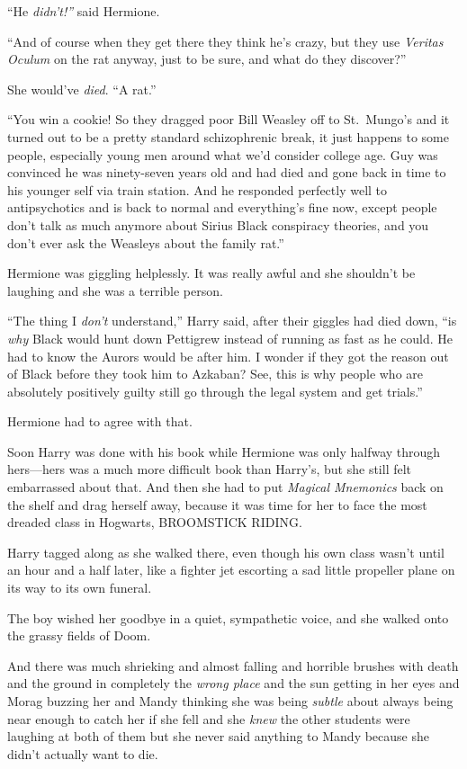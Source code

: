 ``He \emph{didn't!''} said Hermione.

``And of course when they get there they think he's crazy, but they use
\emph{Veritas Oculum} on the rat anyway, just to be sure, and what do
they discover?''

She would've \emph{died}. ``A rat.''

``You win a cookie! So they dragged poor Bill Weasley off to St.~Mungo's
and it turned out to be a pretty standard schizophrenic break, it just
happens to some people, especially young men around what we'd consider
college age. Guy was convinced he was ninety-seven years old and had
died and gone back in time to his younger self via train station. And he
responded perfectly well to antipsychotics and is back to normal and
everything's fine now, except people don't talk as much anymore about
Sirius Black conspiracy theories, and you don't ever ask the Weasleys
about the family rat.''

Hermione was giggling helplessly. It was really awful and she shouldn't
be laughing and she was a terrible person.

``The thing I \emph{don't} understand,'' Harry said, after their giggles
had died down, ``is \emph{why} Black would hunt down Pettigrew instead
of running as fast as he could. He had to know the Aurors would be after
him. I wonder if they got the reason out of Black before they took him
to Azkaban? See, this is why people who are absolutely positively guilty
still go through the legal system and get trials.''

Hermione had to agree with that.

Soon Harry was done with his book while Hermione was only halfway
through hers---hers was a much more difficult book than Harry's, but she
still felt embarrassed about that. And then she had to put \emph{Magical
Mnemonics} back on the shelf and drag herself away, because it was time
for her to face the most dreaded class in Hogwarts, BROOMSTICK RIDING.

Harry tagged along as she walked there, even though his own class wasn't
until an hour and a half later, like a fighter jet escorting a sad
little propeller plane on its way to its own funeral.

The boy wished her goodbye in a quiet, sympathetic voice, and she walked
onto the grassy fields of Doom.

And there was much shrieking and almost falling and horrible brushes
with death and the ground in completely the \emph{wrong place} and the
sun getting in her eyes and Morag buzzing her and Mandy thinking she was
being \emph{subtle} about always being near enough to catch her if she
fell and she \emph{knew} the other students were laughing at both of
them but she never said anything to Mandy because she didn't actually
want to die.

